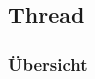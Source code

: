 \vspace*{4cm}
\begin{center}
\part{Thread}
\end{center}
\vspace*{\fill}
\clearpage

\section{Übersicht}\label{sec:Uebersicht}







